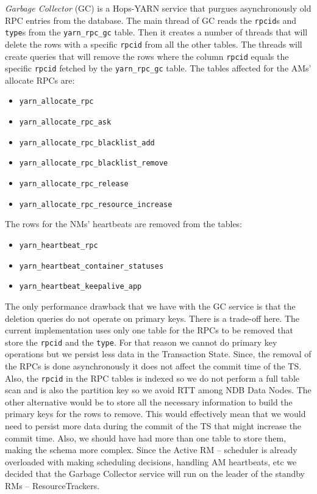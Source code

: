 \emph{Garbage Collector} (GC) is a Hops-YARN service that purgues
asynchronously old RPC entries from the database. The main thread of
GC reads the \texttt{rpcid}s and \texttt{type}s from the
\texttt{yarn\_rpc\_gc} table. Then it creates a number of threads that
will delete the rows with a specific \texttt{rpcid} from all the other
tables. The threads will create
queries that will remove the rows where the column \texttt{rpcid}
equals the specific \texttt{rpcid} fetched by the
\texttt{yarn\_rpc\_gc} table. The tables affected for the AMs'
allocate RPCs are:
\begin{itemize}
\item \texttt{yarn\_allocate\_rpc}
\item \texttt{yarn\_allocate\_rpc\_ask}
\item \texttt{yarn\_allocate\_rpc\_blacklist\_add}
\item \texttt{yarn\_allocate\_rpc\_blacklist\_remove}
\item \texttt{yarn\_allocate\_rpc\_release}
\item \texttt{yarn\_allocate\_rpc\_resource\_increase}
\end{itemize}

The rows for the NMs' heartbeats are removed from the tables:
\begin{itemize}
\item \texttt{yarn\_heartbeat\_rpc}
\item \texttt{yarn\_heartbeat\_container\_statuses}
\item \texttt{yarn\_heartbeat\_keepalive\_app}
\end{itemize}

The only performance drawback that we have with the GC service is that
the deletion queries do not operate on primary keys. There is a
trade-off here. The current implementation uses only one table for the
RPCs to be removed that store the \texttt{rpcid} and the
\texttt{type}. For that reason we cannot do primary key operations but
we persist less data in the Transaction State. Since, the removal of
the RPCs is done asynchronously it does not affect the commit time
of the TS. Also, the \texttt{rpcid} in the RPC tables is indexed so we
do not perform a full table scan and is also the partition key so we avoid RTT
among NDB Data Nodes. The other alternative would be to
store all the necessary information to build the primary keys for the
rows to remove. This would effectively mean that we would need to persist more
data during the commit of the TS that might increase the commit
time. Also, we should have had more than one table to store them,
making the schema more complex. Since the Active RM -- scheduler is
already overloaded with making scheduling decisions, handling AM
heartbeats, etc we decided that the Garbage Collector service will run on
the leader of the standby RMs -- ResourceTrackers.

